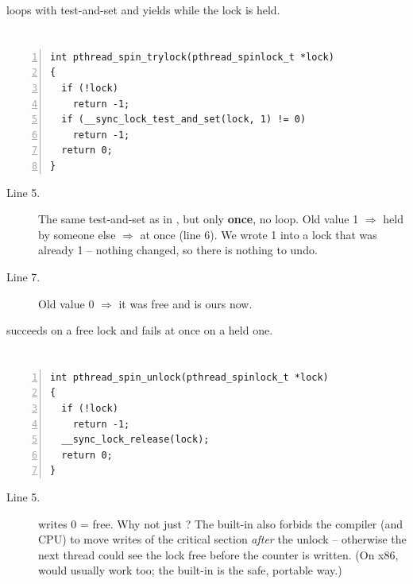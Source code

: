 \documentclass[11pt]{report}
\newcommand{\done}[1]{\begin{keybox}[title={Done when}]#1\end{keybox}}
\begin{document}
\done{ loops with test-and-set and yields while the lock is held.}

\section{ \hfill {\normalsize{}}}

\begin{lstlisting}[numbers=left,numberstyle=\tiny\color{headgray}]
int pthread_spin_trylock(pthread_spinlock_t *lock)
{
  if (!lock)
    return -1;
  if (__sync_lock_test_and_set(lock, 1) != 0)
    return -1;
  return 0;
}
\end{lstlisting}

\begin{description}
  \item[Line 5.] The same test-and-set as in , but only \textbf{once}, no loop. Old value 1
        $\Rightarrow$ held by someone else $\Rightarrow$  at once (line 6). We wrote 1 into a lock
        that was already 1 -- nothing changed, so there is nothing to undo.
  \item[Line 7.] Old value 0 $\Rightarrow$ it was free and is ours now.
\end{description}

\done{ succeeds on a free lock and fails at once on a held one.}

\section{ \hfill {\normalsize{}}}

\begin{lstlisting}[numbers=left,numberstyle=\tiny\color{headgray}]
int pthread_spin_unlock(pthread_spinlock_t *lock)
{
  if (!lock)
    return -1;
  __sync_lock_release(lock);
  return 0;
}
\end{lstlisting}

\begin{description}
  \item[Line 5.]  writes 0 = free. Why not just ? The built-in
        also forbids the compiler (and CPU) to move writes of the critical section \emph{after} the
        unlock -- otherwise the next thread could see the lock free before the counter is written.
        (On x86,  would usually work too; the built-in is the safe, portable way.)
\end{description}
\end{document}
